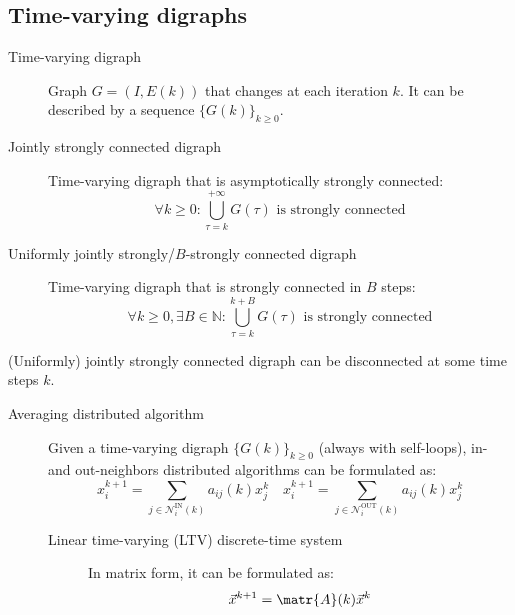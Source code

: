 \subsection{Time-varying digraphs}

\begin{description}
    \item[Time-varying digraph] 
        Graph $G=(I, E(k))$ that changes at each iteration $k$. It can be described by a sequence $\{ G(k) \}_{k \geq 0}$.

    \item[Jointly strongly connected digraph] 
        Time-varying digraph that is asymptotically strongly connected:
        \[ \forall k \geq 0: \bigcup_{\tau=k}^{+\infty} G(\tau) \text{ is strongly connected} \]

    \item[Uniformly jointly strongly/$B$-strongly connected digraph]   
        Time-varying digraph that is strongly connected in $B$ steps:
        \[ \forall k \geq 0, \exists B \in \mathbb{N}: \bigcup_{\tau=k}^{k+B} G(\tau) \text{ is strongly connected} \]
\end{description}

\begin{remark}
    (Uniformly) jointly strongly connected digraph can be disconnected at some time steps $k$.
\end{remark}

\begin{description}
    \item[Averaging distributed algorithm] 
        Given a time-varying digraph $\{ G(k) \}_{k \geq 0}$ (always with self-loops), in- and out-neighbors distributed algorithms can be formulated as:
        \[
            x_i^{k+1} = \sum_{j \in \mathcal{N}_i^\text{IN}(k)} a_{ij}(k) x_j^k
            \quad
            x_i^{k+1} = \sum_{j \in \mathcal{N}_i^\text{OUT}(k)} a_{ij}(k) x_j^k
        \]

        \begin{description}
            \item[Linear time-varying (LTV) discrete-time system] 
                In matrix form, it can be formulated as:
                \[ \vec{x}^{k+1} = \matr{A}(k) \vec{x}^k \]
        \end{description}
\end{description}


